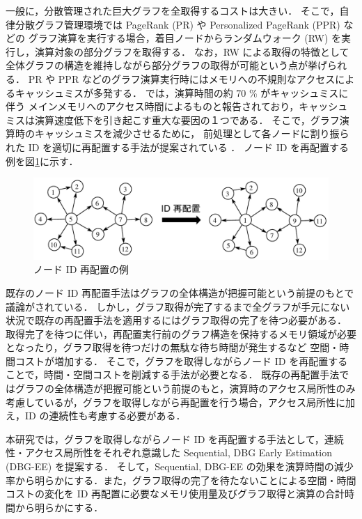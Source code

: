 一般に，分散管理された巨大グラフを全取得するコストは大きい．
そこで，自律分散グラフ管理環境では PageRank (PR) \cite{page1999pagerank} や Personalized PageRank (PPR) \cite{page1999pagerank} などの
グラフ演算を実行する場合，着目ノードからランダムウォーク (RW) を実行し，演算対象の部分グラフを取得する．
なお，RW による取得の特徴として
全体グラフの構造を維持しながら部分グラフの取得が可能という点が挙げられる．
PR や PPR などのグラフ演算実行時にはメモリへの不規則なアクセスによるキャッシュミスが多発する．
\cite{wei2016speedup,zhang2017making} では，演算時間の約 70 \% がキャッシュミスに伴う
メインメモリへのアクセス時間によるものと報告されており，キャッシュミスは演算速度低下を引き起こす重大な要因の１つである．
そこで，グラフ演算時のキャッシュミスを減少させるために，
前処理として各ノードに割り振られた ID を適切に再配置する手法が提案されている \cite{wei2016speedup,zhang2017making,balaji2018graph,arai2016rabbit,lakhotia2017recall,faldu2019closer}．
ノード ID を再配置する例を図\ref{reordering_intro}に示す．
\begin{figure}[t]
  \centering
  \includegraphics[width=\linewidth]{./figure/reordering_intro.pdf}
  \caption{ノード ID 再配置の例}
  \label{reordering_intro}
\end{figure}
既存のノード ID 再配置手法はグラフの全体構造が把握可能という前提のもとで議論がされている．
しかし，グラフ取得が完了するまで全グラフが手元にない状況で既存の再配置手法を適用するにはグラフ取得の完了を待つ必要がある．
取得完了を待つに伴い，再配置実行前のグラフ構造を保持するメモリ領域が必要となったり，グラフ取得を待つだけの無駄な待ち時間が発生するなど
空間・時間コストが増加する．
そこで，グラフを取得しながらノード ID を再配置することで，時間・空間コストを削減する手法が必要となる．
既存の再配置手法ではグラフの全体構造が把握可能という前提のもと，演算時のアクセス局所性のみ考慮しているが，グラフを取得しながら再配置を行う場合，アクセス局所性に加え，ID の連続性も考慮する必要がある．

本研究では，グラフを取得しながらノード ID を再配置する手法として，連続性・アクセス局所性をそれぞれ意識した Sequential, DBG Early Estimation (DBG-EE) を提案する．
そして，Sequential, DBG-EE の効果を演算時間の減少率から明らかにする．また，グラフ取得の完了を待たないことによる空間・時間コストの変化を 
ID 再配置に必要なメモリ使用量及びグラフ取得と演算の合計時間から明らかにする．

